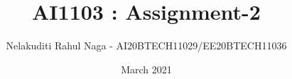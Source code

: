 \documentclass[journal,12pt,twocolumn]{IEEEtran}
\date{March 2021}
\DeclareMathOperator*{\Res}{Res}
\begin{document}
\newcommand{\BEQA}{\begin{eqnarray}}
\newcommand{\EEQA}{\end{eqnarray}}
\newcommand{\define}{\stackrel{\triangle}{=}}

\raggedbottom
\setlength{\parindent}{0pt}
\providecommand{\mbf}{\mathbf}
\providecommand{\pr}[1]{\ensuremath{\Pr\left(#1\right)}}
\providecommand{\qfunc}[1]{\ensuremath{Q\left(#1\right)}}
\providecommand{\fn}[1]{\ensuremath{f\left(#1\right)}}
\providecommand{\e}[1]{\ensuremath{E\left(#1\right)}}
\providecommand{\sbrak}[1]{\ensuremath{{}\left[#1\right]}}
\providecommand{\lsbrak}[1]{\ensuremath{{}\left[#1\right.}}
\providecommand{\rsbrak}[1]{\ensuremath{{}\left.#1\right]}}
\providecommand{\brak}[1]{\ensuremath{\left(#1\right)}}
\providecommand{\lbrak}[1]{\ensuremath{\left(#1\right.}}
\providecommand{\rbrak}[1]{\ensuremath{\left.#1\right)}}
\providecommand{\cbrak}[1]{\ensuremath{\left\{#1\right\}}}
\providecommand{\lcbrak}[1]{\ensuremath{\left\{#1\right.}}
\providecommand{\rcbrak}[1]{\ensuremath{\left.#1\right\}}}
\theoremstyle{remark}
\newtheorem{rem}{Remark}
\newcommand{\sgn}{\mathop{\mathrm{sgn}}}
\providecommand{\abs}[1]{\vert#1\vert}
\providecommand{\res}[1]{\Res\displaylimits_{#1}} 
\providecommand{\norm}[1]{\lVert#1\rVert}
\providecommand{\mtx}[1]{\mathbf{#1}}
\providecommand{\mean}[1]{E[ #1 ]}
\providecommand{\fourier}{\overset{\mathcal{F}}{ \rightleftharpoons}}
\providecommand{\system}{\overset{\mathcal{H}}{ \longleftrightarrow}}
\newcommand{\solution}{\noindent \textbf{Solution: }}
\newcommand{\cosec}{\,\text{cosec}\,}
\providecommand{\dec}[2]{\ensuremath{\overset{#1}{\underset{#2}{\gtrless}}}}
\newcommand{\myvec}[1]{\ensuremath{\begin{pmatrix}#1\end{pmatrix}}}
\newcommand{\mydet}[1]{\ensuremath{\begin{vmatrix}#1\end{vmatrix}}}
\makeatletter
{}
\makeatother
\let\StandardTheFigure\thefigure
\let\vec\mathbf
\renewcommand{\thefigure}{\theproblem}
\def\putbox#1#2#3{\makebox[0in][l]{\makebox[#1][l]{}\raisebox{\baselineskip}[0in][0in]{\raisebox{#2}[0in][0in]{#3}}}}
     \def\rightbox#1{\makebox[0in][r]{#1}}
     \def\centbox#1{\makebox[0in]{#1}}
     \def\topbox#1{\raisebox{-\baselineskip}[0in][0in]{#1}}
     \def\midbox#1{\raisebox{-0.5\baselineskip}[0in][0in]{#1}}
\vspace{3cm}
\title{ AI1103 : Assignment-2}
\author{Nelakuditi Rahul Naga - AI20BTECH11029/EE20BTECH11036}
\maketitle
\newpage
\bigskip
\renewcommand{\thefigure}{\theenumi}
\renewcommand{\thetable}{\theenumi}
\end{document}

